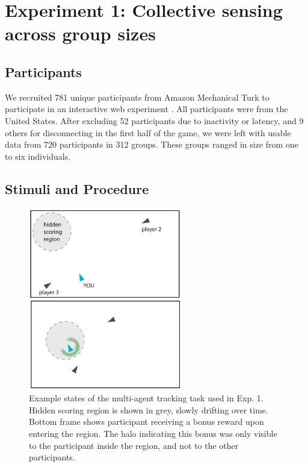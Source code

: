 \documentclass[12pt,letterpaper]{article}
\begin{document}




\section{Experiment 1: Collective sensing across group sizes}

\subsection{Participants}
We recruited 781 unique participants from Amazon Mechanical Turk to participate in an interactive web experiment \cite{hawkins_conducting_2014}.  All participants were from the United States.  After excluding 52 participants due to inactivity or latency, and 9 others for disconnecting in the first half of the game, we were left with usable data from 720 participants in 312 groups.  These groups ranged in size from one to six individuals. 

\subsection{Stimuli and Procedure}

\begin{figure}[t!]
  \centering
  \includegraphics[width=0.6\textwidth]{./figures/experiment1_design.pdf}
  \hspace{0.1cm}
  \caption{Example states of the multi-agent tracking task used in Exp. 1. Hidden scoring region is shown in grey, slowly drifting over time. Bottom frame shows participant receiving a bonus reward upon entering the region. The halo indicating this bonus was only visible to the participant inside the region, and not to the other participants.}
  \label{fig:score}
\end{figure}
\end{document}
